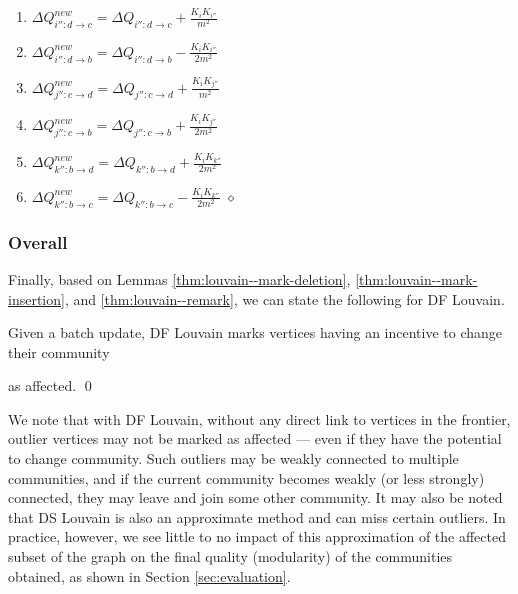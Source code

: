 \begin{enumerate}[start=23]
  \item $\Delta Q_{i'':d \rightarrow c}^{new} = \Delta Q_{i'':d \rightarrow c} + \frac{K_iK_{i''}}{m^2}$
  \item $\Delta Q_{i'':d \rightarrow b}^{new} = \Delta Q_{i'':d \rightarrow b} - \frac{K_iK_{i''}}{2m^2}$
  \item $\Delta Q_{j'':c \rightarrow d}^{new} = \Delta Q_{j'':c \rightarrow d} + \frac{K_iK_{j''}}{m^2}$
  \item $\Delta Q_{j'':c \rightarrow b}^{new} = \Delta Q_{j'':c \rightarrow b} + \frac{K_iK_{j''}}{2m^2}$
  \item $\Delta Q_{k'':b \rightarrow d}^{new} = \Delta Q_{k'':b \rightarrow d} + \frac{K_iK_{k''}}{2m^2}$
  \item $\Delta Q_{k'':b \rightarrow c}^{new} = \Delta Q_{k'':b \rightarrow c} - \frac{K_iK_{k''}}{2m^2}$ \hfill $\diamond$
\end{enumerate}




\subsubsection{Overall}

Finally, based on Lemmas \ref{thm:louvain--mark-deletion}, \ref{thm:louvain--mark-insertion}, and \ref{thm:louvain--remark}, we can state the following for DF Louvain.

\begin{theorem}
\label{thm:louvain}
Given a batch update, DF Louvain marks vertices having an incentive to change their community as affected. \qed
\end{theorem}

We note that with DF Louvain, without any direct link to vertices in the frontier, outlier vertices may not be marked as affected --- even if they have the potential to change community. Such outliers may be weakly connected to multiple communities, and if the current community becomes weakly (or less strongly) connected, they may leave and join some other community. It may also be noted that DS Louvain is also an approximate method and can miss certain outliers. In practice, however, we see little to no impact of this approximation of the affected subset of the graph on the final quality (modularity) of the communities obtained, as shown in Section \ref{sec:evaluation}.









